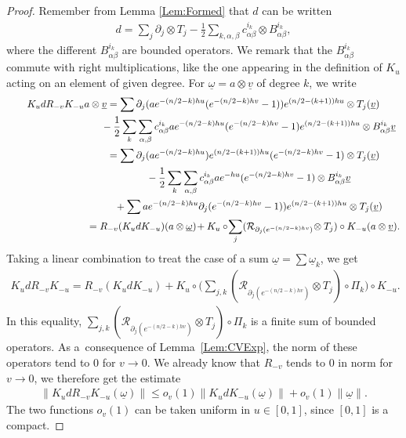 \documentclass[pdftex]{sigma}
\newcommand{\omegat}{\underline{\omega}}
\newcommand{\RightMult}{\mathcal{R}}
\newcommand{\vt}{\underline{v}}
\numberwithin{equation}{section}
\begin{document}
\begin{proof}
Remember from Lemma \ref{Lem:Formed} that $d$ can be written
\begin{gather*}
d = \sum_j \partial_j \otimes T_j - \frac{1}{2} \sum_{k,\alpha,\beta} c^{i_k}_{\alpha \beta} \otimes B^{i_k}_{\alpha \beta},
\end{gather*}
where the dif\/ferent $B^{i_k}_{\alpha \beta}$ are bounded operators. We remark that the $B^{i_k}_{\alpha \beta}$ commute with right multiplications, like the one appearing in the def\/inition of $K_u$ acting on an element of given degree. For $\omegat = a \otimes \vt$ of degree $k$, we write
\begin{gather*}
K_u d R_{-v} K_{-u} a \otimes \vt = \sum \partial _j(a e^{-(n/2-k)h u}(e^{-(n/2-k) hv} -1) )e^{(n/2-(k+1)) h u} \otimes T_j( \vt ) \\
\hphantom{K_u d R_{-v} K_{-u} a \otimes \vt =}{}
- \frac{1}{2} \sum_{k} \sum_{\alpha, \beta} c^{i_k}_{\alpha \beta} a e^{-(n/2-k)h u}(e^{-(n/2-k) hv} -1) e^{(n/2-(k+1)) h u} \otimes B^{i_k}_{\alpha \beta} \vt \\
\hphantom{K_u d R_{-v} K_{-u} a \otimes \vt }{}
= \sum \partial _j(a e^{-(n/2-k)h u})e^{(n/2-(k+1)) h u} (e^{-(n/2-k) hv} -1) \otimes T_j( \vt ) \\
\hphantom{K_u d R_{-v} K_{-u} a \otimes \vt =}{}
- \frac{1}{2} \sum_{k} \sum_{\alpha, \beta} c^{i_k}_{\alpha \beta} a e^{-h u} (e^{-(n/2-k) hv} -1) \otimes B^{i_k}_{\alpha \beta} \vt \\
\hphantom{K_u d R_{-v} K_{-u} a \otimes \vt =}{}
+ \sum a e^{-(n/2-k)h u}\partial _j(e^{-(n/2-k) hv} -1) )e^{(n/2-(k+1)) h u} \otimes T_j( \vt ) \\
\hphantom{K_u d R_{-v} K_{-u} a \otimes \vt }{}
= R_{-v}(K_u d K_{-u})(a \otimes \omegat) \! + K_{u} \circ\! \sum_{j} (\RightMult_{\partial _j(e^{-(n/2-k) h v})}\! \otimes T_j) \circ K_{-u}(a \otimes \vt).
\end{gather*}
Taking a linear combination to treat the case of a sum $\omegat = \sum \omegat_k$, we get
\begin{gather*}
K_u d R_{-v} K_{-u} = R_{-v}(K_u d K_{-u}) + K_{u} \circ \bigg( \sum_{j,k} (\RightMult_{\partial _j(e^{-(n/2-k) h v})} \otimes T_j) \circ \Pi_k \bigg) \circ K_{-u}.
\end{gather*}
In this equality, $\sum_{j,k} (\RightMult_{\partial _j(e^{-(n/2-k) h v})} \otimes T_j) \circ \Pi_k$ is a f\/inite sum of bounded operators. As a~consequence of Lemma~\ref{Lem:CVExp}, the norm of these operators tend to $0$ for $ v \to 0$. We already know that $R_{-v}$ tends to $0$ in norm for $v \to 0$, we therefore get the estimate
\begin{gather}
\label{Eqn:EstimateKdRK}
\| K_u d R_{-v} K_{-u}( \omegat) \| \leqslant o_v(1) \| K_u d K_{-u}( \omegat) \| + o_v(1) \| \omegat \|.
\end{gather}
The two functions $o_v(1)$ can be taken uniform in $u \in [0,1]$, since $[0,1]$ is a compact.


\end{proof}
\end{document}
